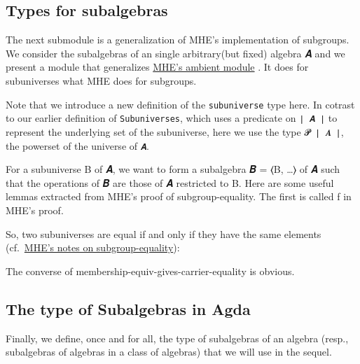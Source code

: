 \documentclass[sigplan,screen]{acmart}
\begin{document}
\subsection{Types for subalgebras}\label{types-for-subalgebras}
The next submodule is a generalization of MHE's implementation of subgroups. We consider the subalgebras of an single arbitrary(but fixed) algebra 𝑨 and we present a module that generalizes \href{https://www.cs.bham.ac.uk/~mhe/HoTT-UF-in-Agda-Lecture-Notes/HoTT-UF-Agda.html\#subgroups-sip}{MHE's ambient module} . It does for subuniverses what MHE does for subgroups.
\begin{code}\end{code}

Note that we introduce a new definition of the \texttt{subuniverse} type here. In cotrast to our earlier definition of \texttt{Subuniverses}, which uses a predicate on \texttt{∣\ 𝑨\ ∣} to represent the underlying set of the subuniverse, here we use the type \texttt{𝓟\ ∣\ 𝑨\ ∣}, the powerset of the universe of \texttt{𝑨}.
\begin{code}\end{code}

For a subuniverse B of 𝑨, we want to form a subalgebra 𝑩 = ⟨B, \ldots{}⟩ of 𝑨 such that the operations of 𝑩 are those of 𝑨 restricted to B. Here are some useful lemmas extracted from MHE's proof of subgroup-equality. The first is called f in MHE's proof.
\begin{code}\end{code}

So, two subuniverses are equal if and only if they have the same elements (cf.~\href{https://www.cs.bham.ac.uk/~mhe/HoTT-UF-in-Agda-Lecture-Notes/HoTT-UF-Agda.html\#371022}{MHE's notes on subgroup-equality}):
\begin{code}\end{code}

The converse of membership-equiv-gives-carrier-equality is obvious.
\begin{code}\end{code}

\subsection{The type of Subalgebras in Agda}\label{the-type-of-subalgebras-in-agda}
Finally, we define, once and for all, the type of subalgebras of an algebra (resp., subalgebras of algebras in a class of algebras) that we will use in the sequel.
\begin{code}\end{code}
\end{document}
